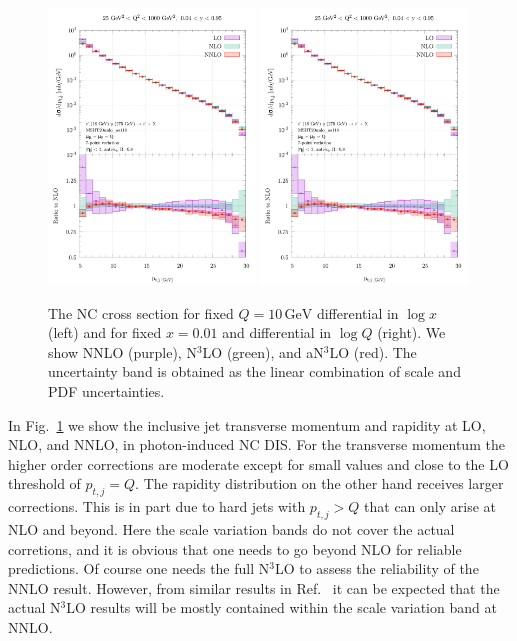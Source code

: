 \documentclass[submission, PhysCodeb]{SciPost}
\newcommand{\GEV}{\,\mathrm{GeV}}
\newcommand{\NNNLO}{N$^3$LO}
\begin{document}
\begin{figure}[tb!]
  \centering\includegraphics[width=0.49\textwidth,page=1]{../paper_runs/lab_frame/lab-frame.pdf}
  \centering\includegraphics[width=0.49\textwidth,page=2]{../paper_runs/lab_frame/lab-frame.pdf}
  \caption{The NC cross section for fixed $Q=10\GEV$ differential in
    $\log x$ (left) and for fixed $x=0.01$ and differential in $\log
    Q$ (right). We show NNLO (purple), \NNNLO{} (green), and a\NNNLO{}
    (red). The uncertainty band is obtained as the linear combination
    of scale and PDF uncertainties.}
  \label{fig:labframe}
\end{figure}
In Fig.~\ref{fig:labframe} we show the inclusive jet transverse
momentum and rapidity at LO, NLO, and NNLO, in photon-induced NC
DIS. For the transverse momentum the higher order corrections are
moderate except for small values and close to the LO threshold of
$p_{t,j}=Q$. The rapidity distribution on the other hand receives
larger corrections. This is in part due to hard jets with $p_{t,j}>Q$
that can only arise at NLO and beyond. Here the scale variation bands
do not cover the actual corretions, and it is obvious that one needs
to go beyond NLO for reliable predictions. Of course one needs the
full \NNNLO{} to assess the reliability of the NNLO result. However,
from similar results in Ref.~\cite{Currie:2018fgr} it can be expected
that the actual \NNNLO{} results will be mostly contained within the
scale variation band at NNLO.
\end{document}
